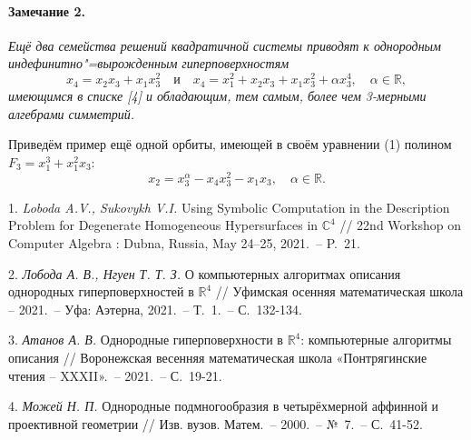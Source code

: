 \paragraph{Замечание 2.} {\it
	Ещё два семейства решений квадратичной системы приводят к однородным индефинитно"=вырожденным гиперповерхностям
	\begin{equation*}
		x_4 = x_2 x_3 + x_1 x_3^2 \quad \text{и} \quad x_4 = x_1^2 + x_2 x_3 + x_1 x_3^2 + \alpha x_3^4,  \quad \alpha \in \mathbb{R},
	\end{equation*}
	имеющимся в списке [4] и обладающим, тем самым, более чем 3-мерными алгебрами симметрий.
}

Приведём пример ещё одной орбиты, имеющей в своём уравнении (1) полином $F_3 = x_1^3 + x_1^2x_3$: \begin{equation*}
	x_2 = x_3^{\alpha} - x_4x_3^2 - x_1x_3, \quad \alpha \in \mathbb{R}.
\end{equation*}

\litlist

1. {\it Loboda A.V., Sukovykh V.I.} Using Symbolic Computation in the Description
Problem for Degenerate Homogeneous Hy\-per\-sur\-fa\-ces in $\mathbb{C}^4$ // 22nd Workshop on Computer Algebra : Dubna, Russia, May 24–25, 2021.~-- P.~21.

2. {\it Лобода А. В., Нгуен Т. Т. З.} О компьютерных алгоритмах описания однородных гиперповерхностей в $\mathbb{R}^4$ // Уфимская осенняя математическая школа -- 2021.~-- Уфа: Аэтерна, 2021.~-- Т.~1.~-- С.~132-134.

3. {\it Атанов А. В.} Однородные гиперповерхности в $\mathbb{R}^4$: компьютерные алгоритмы описания // Воронежская весенняя математическая школа «Понтрягинские чтения -- {XXXII}».~-- 2021.~-- С.~19-21.

4. {\it Можей Н. П.} Однородные подмногообразия в четырёхмерной аффинной и проективной геометрии // Изв. вузов. Матем.~-- 2000.~-- №~7.~-- С.~41-52.

